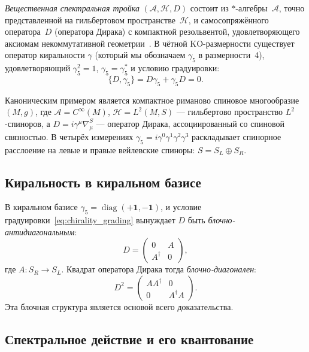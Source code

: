 \documentclass[12pt,a4paper]{article}
\theoremstyle{definition}
\theoremstyle{remark}
\newcommand{\Hilb}{\mathcal{H}}
\newcommand{\Alg}{\mathcal{A}}
\begin{document}
\emph{Вещественная спектральная тройка} $(\Alg, \Hilb, D)$ состоит из
$*$-алгебры~$\Alg$, точно представленной на гильбертовом
пространстве~$\Hilb$, и самосопряжённого оператора~$D$ (оператора
Дирака) с компактной резольвентой, удовлетворяющего аксиомам
некоммутативной геометрии~\cite{Connes:1994book, Connes:1995cr,
Connes:2008vs}.  В чётной KO-размерности существует оператор
киральности $\gamma$ (который мы обозначаем $\gamma_5$ в размерности~4),
удовлетворяющий $\gamma_5^2 = 1$, $\gamma_5 = \gamma_5^*$ и условию
градуировки:
\begin{equation}\label{eq:chirality_grading}
  \{D, \gamma_5\} = D\gamma_5 + \gamma_5 D = 0.
\end{equation}

Каноническим примером является компактное риманово спиновое
многообразие~$(M, g)$, где $\Alg = C^\infty(M)$,
$\Hilb = L^2(M, S)$ --- гильбертово пространство
$L^2$-спиноров, а $D = i\gamma^\mu\nabla_\mu^S$ --- оператор Дирака,
ассоциированный со спиновой связностью.  В четырёх измерениях
$\gamma_5 = i\gamma^0\gamma^1\gamma^2\gamma^3$ раскладывает спинорное
расслоение на левые и правые вейлевские спиноры:
$S = S_L \oplus S_R$.

\subsection{Киральность в киральном базисе}

В киральном базисе
$\gamma_5 = \operatorname{diag}(+\mathbf{1}, -\mathbf{1})$, и условие
градуировки~\eqref{eq:chirality_grading} вынуждает $D$ быть
\emph{блочно-антидиагональным}:
\begin{equation}\label{eq:D_chiral_basis}
  D = \begin{pmatrix} 0 & A \\ A^\dagger & 0 \end{pmatrix},
\end{equation}
где $A\colon S_R \to S_L$.  Квадрат оператора Дирака тогда
\emph{блочно-диагонален}:
\begin{equation}\label{eq:D2_chiral_basis}
  D^2 = \begin{pmatrix} AA^\dagger & 0 \\ 0 & A^\dagger A \end{pmatrix}.
\end{equation}
Эта блочная структура является основой всего доказательства.

\subsection{Спектральное действие и его квантование}
\end{document}
